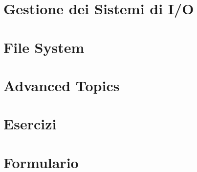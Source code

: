 \documentclass{article}
\begin{document}
\section{Gestione dei Sistemi di I/O}
\pagebreak

\section{File System}
\pagebreak

\section{Advanced Topics}


\pagebreak
\section{Esercizi}




\pagebreak

\section{Formulario}
\end{document}
